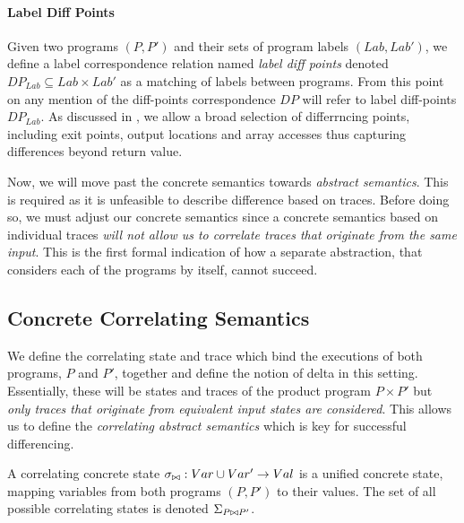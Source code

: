 \paragraph{Label Diff Points} 
Given two programs $(P,P')$ and their sets of program labels $(Lab,Lab')$, we define a label correspondence relation named \emph{label diff points} denoted $DP_{Lab} \subseteq Lab \times Lab'$ as a matching of labels between programs. From this point on any mention of the diff-points correspondence $DP$ will refer to label diff-points $DP_{Lab}$. As discussed in , we allow a broad selection of differrncing points, including exit points, output locations and array accesses thus capturing differences beyond return value. %

Now, we will move past the concrete semantics towards \emph{abstract semantics}. This is required as it is unfeasible to describe difference based on traces. Before doing so, we must adjust our concrete semantics since a concrete semantics based on individual traces \emph{will not allow us to correlate traces that originate from the same input}. This is the first formal indication of how a separate abstraction, that considers each of the programs by itself, cannot succeed.

\subsection{Concrete Correlating Semantics} 

We define the correlating state and trace which bind the executions of both programs, $P$ and $P'$, together and define the notion of delta in this setting. Essentially, these will be states and traces of the product program $P \times P'$ but \emph{only traces that originate from equivalent input states are considered}. This allows us to define the \emph{correlating abstract semantics} which is key for successful differencing.

\begin{definition}
A correlating concrete state $\sigma_{\bowtie} : Var \cup Var' \rightarrow Val$ is a unified concrete state, mapping variables from both programs $(P,P')$ to their values. The set of all possible correlating states is denoted $\Sigma_{P {\bowtie} P'}$.
\end{definition}

